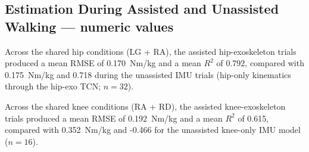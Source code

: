 \subsection{Estimation During Assisted and Unassisted Walking — numeric values}

Across the shared hip conditions (LG + RA), the assisted hip-exoskeleton trials produced a mean RMSE of 0.170~Nm/kg and a mean $R^2$ of 0.792, compared with 0.175~Nm/kg and 0.718 during the unassisted IMU trials (hip-only kinematics through the hip-exo TCN; $n=32$).

Across the shared knee conditions (RA + RD), the assisted knee-exoskeleton trials produced a mean RMSE of 0.192~Nm/kg and a mean $R^2$ of 0.615, compared with 0.352~Nm/kg and -0.466 for the unassisted knee-only IMU model ($n=16$).
